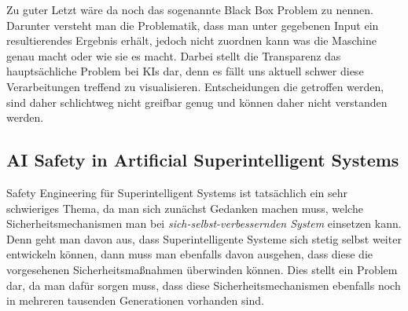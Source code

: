         Zu guter Letzt wäre da noch das sogenannte Black Box Problem zu nennen. Darunter versteht man die Problematik,
        dass man unter gegebenen Input ein resultierendes Ergebnis erhält, jedoch nicht zuordnen kann was die Maschine
        genau macht oder wie sie es macht. \cite{zednik2019solving} Darbei stellt die Transparenz das hauptsächliche
        Problem bei KIs dar, denn es fällt uns aktuell schwer diese Verarbeitungen treffend zu visualisieren.
        Entscheidungen die getroffen werden, sind daher schlichtweg nicht greifbar genug und können daher nicht verstanden
        werden.

        \subsection{AI Safety in Artificial Superintelligent Systems}

        Safety Engineering für Superintelligent Systems ist tatsächlich ein sehr schwieriges Thema, da man sich
        zunächst Gedanken machen muss, welche Sicherheitsmechanismen man bei \textit{sich-selbst-verbessernden System}
        einsetzen kann.\cite[p. 9]{yampolskiy2013safety} Denn geht man davon aus, dass Superintelligente Systeme sich
        stetig selbst weiter entwickeln können, dann muss man ebenfalls davon ausgehen, dass diese die vorgesehenen
        Sicherheitsmaßnahmen überwinden können. Dies stellt ein Problem dar, da man dafür sorgen muss, dass diese
        Sicherheitsmechanismen ebenfalls noch in mehreren tausenden Generationen vorhanden sind.

